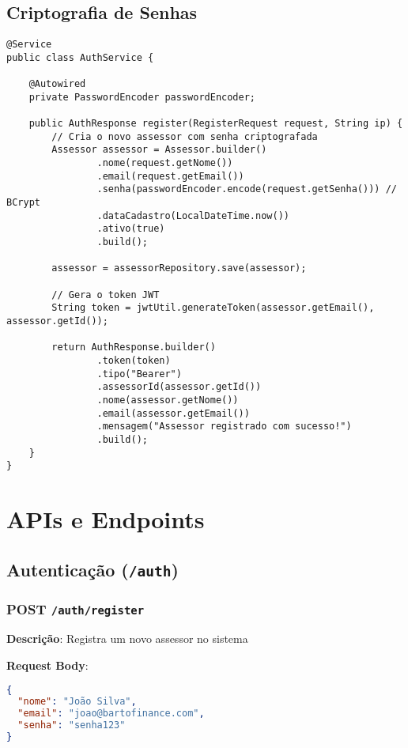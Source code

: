 \documentclass[12pt,a4paper]{article}
\begin{document}
\subsection{Criptografia de Senhas}

\begin{lstlisting}[caption=AuthService - Registro com BCrypt]
@Service
public class AuthService {
    
    @Autowired
    private PasswordEncoder passwordEncoder;
    
    public AuthResponse register(RegisterRequest request, String ip) {
        // Cria o novo assessor com senha criptografada
        Assessor assessor = Assessor.builder()
                .nome(request.getNome())
                .email(request.getEmail())
                .senha(passwordEncoder.encode(request.getSenha())) // BCrypt
                .dataCadastro(LocalDateTime.now())
                .ativo(true)
                .build();
        
        assessor = assessorRepository.save(assessor);
        
        // Gera o token JWT
        String token = jwtUtil.generateToken(assessor.getEmail(), assessor.getId());
        
        return AuthResponse.builder()
                .token(token)
                .tipo("Bearer")
                .assessorId(assessor.getId())
                .nome(assessor.getNome())
                .email(assessor.getEmail())
                .mensagem("Assessor registrado com sucesso!")
                .build();
    }
}
\end{lstlisting}

\section{APIs e Endpoints}

\subsection{Autenticação (\texttt{/auth})}

\subsubsection{POST \texttt{/auth/register}}

\textbf{Descrição}: Registra um novo assessor no sistema

\textbf{Request Body}:
\begin{lstlisting}[language=json]
{
  "nome": "João Silva",
  "email": "joao@bartofinance.com",
  "senha": "senha123"
}
\end{lstlisting}
\end{document}
